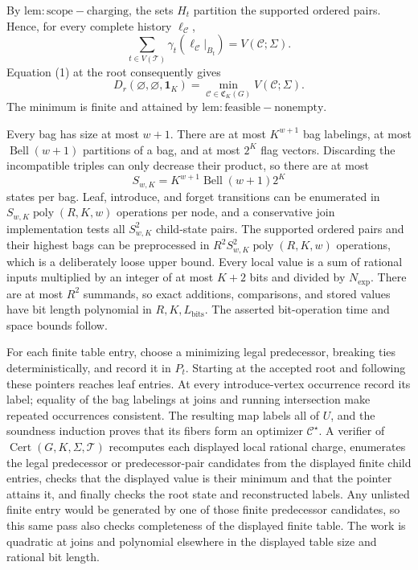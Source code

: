 By \(\mathrm{lem:scope-charging}\), the sets \(H_t\) partition the supported ordered pairs.  Hence, for every complete history \(\ell_{\mathcal C}\),
\[
 \sum_{t\in V(\mathcal T)}\gamma_t(\ell_{\mathcal C}|_{B_t})
 =V(\mathcal C;\Sigma).
\]
Equation (1) at the root consequently gives
\[
 D_r(\varnothing,\varnothing,\mathbf 1_K)
 =\min_{\mathcal C\in\mathfrak C_K(G)}V(\mathcal C;\Sigma).
\]
The minimum is finite and attained by \(\mathrm{lem:feasible-nonempty}\).

Every bag has size at most \(w+1\).  There are at most \(K^{w+1}\) bag labelings, at most \(\operatorname{Bell}(w+1)\) partitions of a bag, and at most \(2^K\) flag vectors.  Discarding the incompatible triples can only decrease their product, so there are at most
\[
 S_{w,K}=K^{w+1}\operatorname{Bell}(w+1)2^K
\]
states per bag.  Leaf, introduce, and forget transitions can be enumerated in \(S_{w,K}\operatorname{poly}(R,K,w)\) operations per node, and a conservative join implementation tests all \(S_{w,K}^2\) child-state pairs.  The supported ordered pairs and their highest bags can be preprocessed in \(R^2S_{w,K}^2\operatorname{poly}(R,K,w)\) operations, which is a deliberately loose upper bound.  Every local value is a sum of rational inputs multiplied by an integer of at most \(K+2\) bits and divided by \(N_{\exp}\).  There are at most \(R^2\) summands, so exact additions, comparisons, and stored values have bit length polynomial in \(R,K,L_{\mathrm{bits}}\).  The asserted bit-operation time and space bounds follow.

For each finite table entry, choose a minimizing legal predecessor, breaking ties deterministically, and record it in \(P_t\).  Starting at the accepted root and following these pointers reaches leaf entries.  At every introduce-vertex occurrence record its label; equality of the bag labelings at joins and running intersection make repeated occurrences consistent.  The resulting map labels all of \(U\), and the soundness induction proves that its fibers form an optimizer \(\mathcal C^\star\).  A verifier of \(\operatorname{Cert}(G,K,\Sigma,\mathcal T)\) recomputes each displayed local rational charge, enumerates the legal predecessor or predecessor-pair candidates from the displayed finite child entries, checks that the displayed value is their minimum and that the pointer attains it, and finally checks the root state and reconstructed labels.  Any unlisted finite entry would be generated by one of those finite predecessor candidates, so this same pass also checks completeness of the displayed finite table.  The work is quadratic at joins and polynomial elsewhere in the displayed table size and rational bit length.


